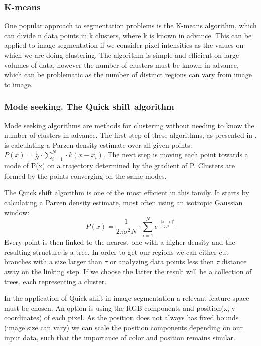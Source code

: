 \documentclass[12pt]{report}
\begin{document}
	\subsubsection{K-means}
	One popular approach to segmentation problems is the K-means algorithm, which can divide n data points in k clusters, where k is known in advance. This can be applied to image segmentation if we consider pixel intensities as the values on which we are doing clustering. The algorithm is simple and efficient on large volumes of data\cite{image_segmentation_techniques}, however the number of clusters must be known in advance, which can be problematic as the number of distinct regions can vary from image to image.
	
	\subsubsection{Mode seeking. The Quick shift algorithm}
	Mode seeking algorithms are methods for clustering without needing to know the number of clusters in advance. The first step of these algorithms, as presented in \cite{mode_seeking}, is calculating a Parzen density estimate over all given points: \(P(x)=\frac{1}{N} \cdot \sum_{i=1}^{N} \cdot k(x-x_i)\). The next step is moving each point towards a mode of P(x) on a trajectory determined by the gradient of P. Clusters are formed by the points converging on the same modes.
	
	The Quick shift algorithm\cite{quickshift_gpu} is one of the most efficient in this family. It starts by calculating a Parzen density estimate, most often using an isotropic Gaussian window:
	\begin{equation}
	P(x) = \frac{1}{2 \pi \sigma^2 N} \cdot \sum_{i=1}^{N} e^\frac{-\Vert x - x_i \Vert^2}{2 \sigma^2}
	\end{equation}
	Every point is then linked to the nearest one with a higher density and the resulting structure is a tree. In order to get our regions we can either cut branches with a size larger than \(\tau\) or analyzing data points less then \(\tau\) distance away on the linking step. If we choose the latter the result will be a collection of trees, each representing a cluster.
	
	In the application of Quick shift in image segmentation a relevant feature space must be chosen. An option is using the RGB components and position(x, y coordinates) of each pixel. As the position does not always has fixed bounds (image size can vary) we can scale the position components depending on our input data, such that the importance of color and position remains similar\cite{quickshift_gpu}.
	
\end{document}
